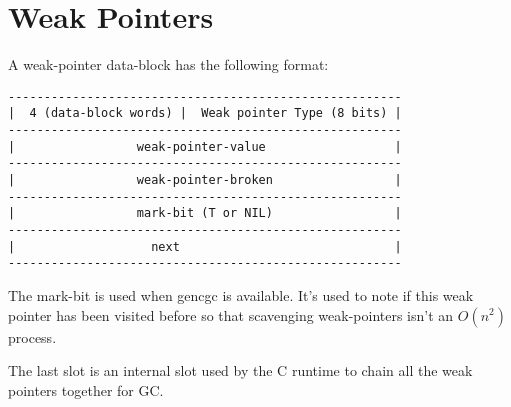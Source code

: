 \section{Weak Pointers}
\label{sec:weak-pointers}

A weak-pointer data-block has the following format:
\begin{verbatim}
-------------------------------------------------------
|  4 (data-block words) |  Weak pointer Type (8 bits) |
-------------------------------------------------------
|                 weak-pointer-value                  |
-------------------------------------------------------
|                 weak-pointer-broken                 |
-------------------------------------------------------
|                 mark-bit (T or NIL)                 |
-------------------------------------------------------
|                   next                              |
-------------------------------------------------------
\end{verbatim}

The mark-bit is used when gencgc is available.  It's used to note if
this weak pointer has been visited before so that scavenging
weak-pointers isn't an $O(n^2)$ process.

The last slot is an internal slot used by the C runtime to chain all
the weak pointers together for GC.

